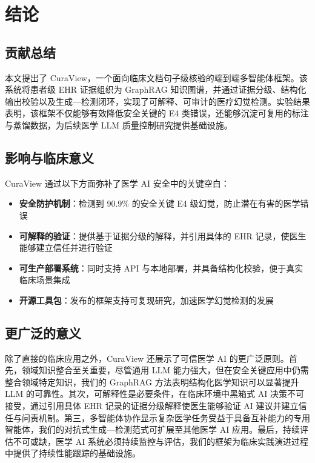 \documentclass[11pt]{article}
\begin{document}
\section{结论}
\subsection{贡献总结}

本文提出了 CuraView，一个面向临床文档句子级核验的端到端多智能体框架。该系统将患者级 EHR 证据组织为 GraphRAG 知识图谱，并通过证据分级、结构化输出校验以及生成---检测闭环，实现了可解释、可审计的医疗幻觉检测。实验结果表明，该框架不仅能够有效降低安全关键的 E4 类错误，还能够沉淀可复用的标注与蒸馏数据，为后续医学 LLM 质量控制研究提供基础设施。

\subsection{影响与临床意义}

CuraView 通过以下方面弥补了医学 AI 安全中的关键空白：

\begin{itemize}
\item
  \textbf{安全防护机制}：检测到 90.9\% 的安全关键 E4 级幻觉，防止潜在有害的医学错误
\item
  \textbf{可解释的验证}：提供基于证据分级的解释，并引用具体的 EHR 记录，使医生能够建立信任并进行验证
\item
  \textbf{可生产部署系统}：同时支持 API 与本地部署，并具备结构化校验，便于真实临床场景集成
\item
  \textbf{开源工具包}：发布的框架支持可复现研究，加速医学幻觉检测的发展
\end{itemize}

\subsection{更广泛的意义}

除了直接的临床应用之外，CuraView 还展示了可信医学 AI 的更广泛原则。首先，领域知识整合至关重要，尽管通用 LLM 能力强大，但在安全关键应用中仍需整合领域特定知识，我们的 GraphRAG 方法表明结构化医学知识可以显著提升 LLM 的可靠性。其次，可解释性是必要条件，在临床环境中黑箱式 AI 决策不可接受，通过引用具体 EHR 记录的证据分级解释使医生能够验证 AI 建议并建立信任与问责机制。第三，多智能体协作显示复杂医学任务受益于具备互补能力的专用智能体，我们的对抗式生成---检测范式可扩展至其他医学 AI 应用。最后，持续评估不可或缺，医学 AI 系统必须持续监控与评估，我们的框架为临床实践演进过程中提供了持续性能跟踪的基础设施。
\end{document}
